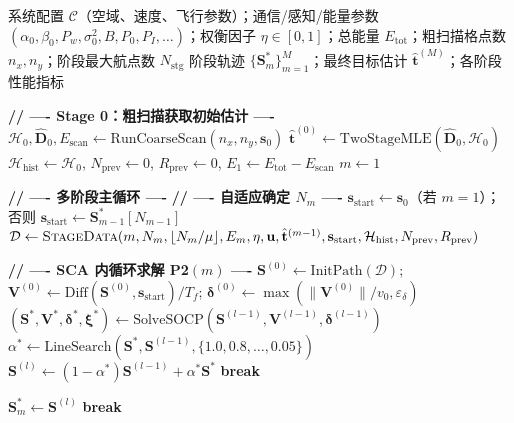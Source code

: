 \begin{algorithm}[htbp]
\caption{多阶段 ISAC 轨迹优化与目标定位}
\label{alg:multistage}
\begin{algorithmic}[1]
\REQUIRE 系统配置 $\mathcal{C}$（空域、速度、飞行参数）；通信/感知/能量参数 $(\alpha_0,\beta_0,P_w,\sigma_0^2,B,P_0,P_I,\ldots)$；权衡因子 $\eta\in[0,1]$；总能量 $E_{\mathrm{tot}}$；粗扫描格点数 $n_x,n_y$；阶段最大航点数 $N_{\mathrm{stg}}$
\ENSURE 阶段轨迹 $\{\mathbf{S}_m^*\}_{m=1}^{M}$；最终目标估计 $\hat{\mathbf{t}}^{(M)}$；各阶段性能指标

\medskip
\STATE \textbf{// ---- Stage 0：粗扫描获取初始估计 ----}
\STATE $\mathcal{H}_0,\widehat{\mathbf{D}}_0,E_{\mathrm{scan}}\gets\text{RunCoarseScan}(n_x,n_y,\mathbf{s}_0)$
\STATE $\hat{\mathbf{t}}^{(0)}\gets\text{TwoStageMLE}(\widehat{\mathbf{D}}_0,\mathcal{H}_0)$
\STATE $\mathcal{H}_{\mathrm{hist}}\gets\mathcal{H}_0$,\; $N_{\mathrm{prev}}\gets 0$,\; $R_{\mathrm{prev}}\gets 0$,\; $E_1\gets E_{\mathrm{tot}}-E_{\mathrm{scan}}$
\STATE $m\gets 1$

\medskip
\STATE \textbf{// ---- 多阶段主循环 ----}
    \STATE \textbf{// ---- 自适应确定 $N_m$ ----}
        \STATE $\mathbf{s}_{\mathrm{start}}\gets\mathbf{s}_0$（若 $m=1$）；否则 $\mathbf{s}_{\mathrm{start}}\gets\mathbf{S}_{m-1}^*[N_{m-1}]$
        \STATE $\mathcal{D}\gets\textsc{StageData}(m,N_m,\lfloor N_m/\mu\rfloor,E_m,\eta,\mathbf{u},\hat{\mathbf{t}}^{(m-1)},\mathbf{s}_{\mathrm{start}},\mathcal{H}_{\mathrm{hist}},N_{\mathrm{prev}},R_{\mathrm{prev}})$

        \STATE \textbf{// ---- SCA 内循环求解 P2$(m)$ ----}
        \STATE $\mathbf{S}^{(0)}\gets\text{InitPath}(\mathcal{D})$;\;
            $\mathbf{V}^{(0)}\gets\text{Diff}(\mathbf{S}^{(0)},\mathbf{s}_{\mathrm{start}})/T_f$;\;
            $\bm{\delta}^{(0)}\gets\max(\|\mathbf{V}^{(0)}\|/v_0,\varepsilon_{\delta})$
            \STATE $(\mathbf{S}^*,\mathbf{V}^*,\bm{\delta}^*,\bm{\xi}^*)\gets\text{SolveSOCP}(\mathbf{S}^{(l-1)},\mathbf{V}^{(l-1)},\bm{\delta}^{(l-1)})$
            \STATE $\alpha^*\gets\text{LineSearch}(\mathbf{S}^*,\mathbf{S}^{(l-1)},\{1.0,0.8,\ldots,0.05\})$
            \STATE $\mathbf{S}^{(l)}\gets(1-\alpha^*)\mathbf{S}^{(l-1)}+\alpha^*\mathbf{S}^*$
             \textbf{break} \ENDIF
        \ENDFOR

            \STATE $\mathbf{S}_m^*\gets\mathbf{S}^{(l)}$ \textbf{break} 
        \ENDIF
    \ENDFOR


\end{algorithmic}
\end{algorithm}
